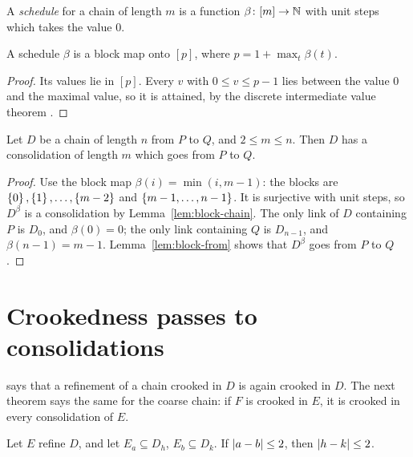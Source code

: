 \begin{definition}\label{def:schedule}
A \emph{schedule} for a chain of length $m$ is a function $\beta\colon[m]\to\mathbb{N}$ with unit steps
which takes the value $0$.
\end{definition}

\begin{lemma}\label{lem:schedule}
A schedule $\beta$ is a block map onto $[p]$, where $p=1+\max_t\beta(t)$.
\end{lemma}

\begin{proof}
Its values lie in $[p]$. Every $v$ with $0\le v\le p-1$ lies between the value $0$ and the maximal value,
so it is attained, by the discrete intermediate value theorem .
\end{proof}


\begin{lemma}\label{lem:consolidate-length}
Let $D$ be a chain of length $n$ from $P$ to $Q$, and $2\le m\le n$. Then $D$ has a consolidation of
length $m$ which goes from $P$ to $Q$.
\end{lemma}

\begin{proof}
Use the block map $\beta(i)=\min(i,m-1)$: the blocks are $\left\{ 0 \right\},\left\{ 1 \right\},\dots,\left\{ m-2 \right\}$ and
$\left\{ m-1,\dots,n-1 \right\}$. It is surjective with unit steps, so $D^\beta$ is a consolidation by
Lemma~\ref{lem:block-chain}. The only link of $D$ containing $P$ is $D_0$, and $\beta(0)=0$; the only link
containing $Q$ is $D_{n-1}$, and $\beta(n-1)=m-1$. Lemma~\ref{lem:block-from} shows that $D^\beta$ goes from
$P$ to $Q$.
\end{proof}


\section{Crookedness passes to consolidations}\label{sec:bing-thm1}

 says that a refinement of a chain crooked in $D$ is again crooked in $D$. The next
theorem says the same for the coarse chain: if $F$ is crooked in $E$, it is crooked in every
consolidation of $E$.

\begin{lemma}\label{lem:index-dist}
Let $E$ refine $D$, and let $E_a\subseteq D_h$, $E_b\subseteq D_k$. If $\left\lvert a-b\right\rvert\le2$, then
$\left\lvert h-k\right\rvert\le2$.
\end{lemma}

